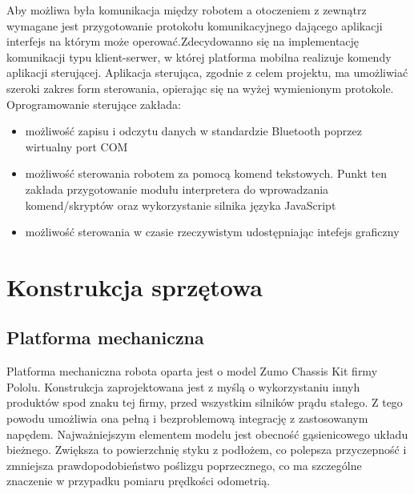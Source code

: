 \documentclass[eng,printmode]{mgr}
\begin{document}
Aby możliwa była komunikacja między robotem a otoczeniem z zewnątrz wymagane jest przygotowanie protokołu komunikacyjnego dającego aplikacji interfejs na którym może operować.Zdecydowanno się na implementację komunikacji typu klient-serwer, w której platforma mobilna realizuje komendy aplikacji sterującej. Aplikacja sterująca, zgodnie z celem projektu, ma umożliwiać szeroki zakres form sterowania, opierając się na wyżej wymienionym protokole. Oprogramowanie sterujące zakłada:
\begin{itemize}
  \item możliwość zapisu i odczytu danych w standardzie Bluetooth poprzez wirtualny port COM
  \item możliwość sterowania robotem za pomocą komend tekstowych. Punkt ten zakłada przygotowanie modułu interpretera do wprowadzania komend/skryptów oraz wykorzystanie silnika języka JavaScript
  \item możliwość sterowania w czasie rzeczywistym udostępniając intefejs graficzny
\end{itemize}

\chapter{Konstrukcja sprzętowa}

 \section{Platforma mechaniczna}

Platforma mechaniczna robota oparta jest o model Zumo Chassis Kit firmy Pololu. Konstrukcja zaprojektowana jest z myślą o wykorzystaniu innyh produktów spod znaku tej firmy, przed wszystkim silników prądu stałego. Z tego powodu umożliwia ona pełną i bezproblemową integrację z zastosowanym napędem. Najważniejszym elementem modelu jest obecność gąsienicowego układu bieżnego. Zwiększa to powierzchnię styku z podłożem, co polepsza przyczepność i zmniejsza prawdopodobieństwo poślizgu poprzecznego, co ma szczególne znaczenie w przypadku pomiaru prędkości odometrią. 
\end{document}
